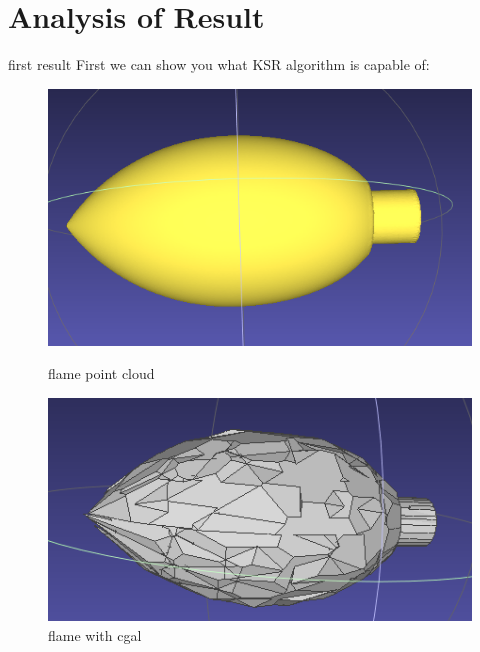 \documentclass[10pt]{beamer}
\begin{document}
\section{Analysis of Result}
\begin{frame}{first result}
First we can show you what KSR algorithm is capable of: 
\begin{figure}[H]
    \begin{minipage}[t]{0.29\textwidth}
        \includegraphics[width=\textwidth]{../../images/screen_kinetic/flame_point.png}
        \caption*{flame point cloud}
    \end{minipage}
    \begin{minipage}[t]{0.29\textwidth}
      \includegraphics[width=\textwidth]{../../images/screen_kinetic/flame_cgal.png}
      \caption*{flame with cgal}
    \end{minipage}
    \begin{minipage}[t]{0.29\textwidth}

\end{minipage}
\end{figure}
\end{frame}
\end{document}
